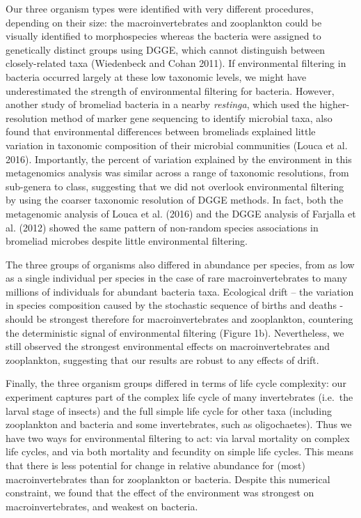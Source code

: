 \documentclass[12pt,]{article}
\begin{document}
Our three organism types were identified with very different procedures,
depending on their size: the macroinvertebrates and zooplankton could be
visually identified to morphospecies whereas the bacteria were assigned
to genetically distinct groups using DGGE, which cannot distinguish
between closely-related taxa (Wiedenbeck and Cohan 2011). If
environmental filtering in bacteria occurred largely at these low
taxonomic levels, we might have underestimated the strength of
environmental filtering for bacteria. However, another study of
bromeliad bacteria in a nearby \emph{restinga}, which used the
higher-resolution method of marker gene sequencing to identify microbial
taxa, also found that environmental differences between bromeliads
explained little variation in taxonomic composition of their microbial
communities (Louca et al. 2016). Importantly, the percent of variation
explained by the environment in this metagenomics analysis was similar
across a range of taxonomic resolutions, from sub-genera to class,
suggesting that we did not overlook environmental filtering by using the
coarser taxonomic resolution of DGGE methods. In fact, both the
metagenomic analysis of Louca et al. (2016) and the DGGE analysis of
Farjalla et al. (2012) showed the same pattern of non-random species
associations in bromeliad microbes despite little environmental
filtering.

The three groups of organisms also differed in abundance per species,
from as low as a single individual per species in the case of rare
macroinvertebrates to many millions of individuals for abundant bacteria
taxa. Ecological drift -- the variation in species composition caused by
the stochastic sequence of births and deaths - should be strongest
therefore for macroinvertebrates and zooplankton, countering the
deterministic signal of environmental filtering (Figure 1b).
Nevertheless, we still observed the strongest environmental effects on
macroinvertebrates and zooplankton, suggesting that our results are
robust to any effects of drift.

Finally, the three organism groups differed in terms of life cycle
complexity: our experiment captures part of the complex life cycle of
many invertebrates (i.e.~the larval stage of insects) and the full
simple life cycle for other taxa (including zooplankton and bacteria and
some invertebrates, such as oligochaetes). Thus we have two ways for
environmental filtering to act: via larval mortality on complex life
cycles, and via both mortality and fecundity on simple life cycles. This
means that there is less potential for change in relative abundance for
(most) macroinvertebrates than for zooplankton or bacteria. Despite this
numerical constraint, we found that the effect of the environment was
strongest on macroinvertebrates, and weakest on bacteria.
\end{document}
